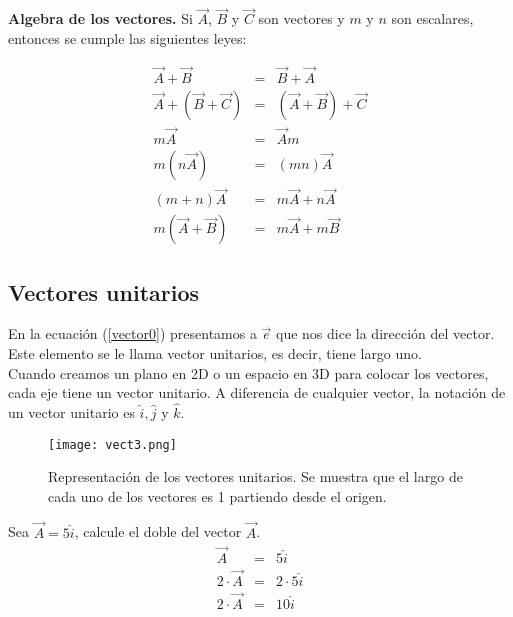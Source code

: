 \begin{mydef}
\textbf{Algebra de los vectores. }Si $\vec{A}$, $\vec{B}$ y $\vec{C}$ son vectores y $m$ y $n$ son escalares, entonces se cumple las siguientes leyes:
\end{mydef}
\begin{eqnarray}
\vec{A}+\vec{B}&=&\vec{B}+\vec{A}\\
\vec{A}+(\vec{B}+\vec{C})&=&(\vec{A}+\vec{B})+\vec{C}\\
m\vec{A}&=&\vec{A}m\\
m(n\vec{A})&=&(mn)\vec{A}\\
(m+n)\vec{A}&=&m\vec{A}+n\vec{A}\\
m(\vec{A}+\vec{B})&=&m\vec{A}+m\vec{B}
\end{eqnarray}



\subsection{Vectores unitarios}

En la ecuación (\ref{vector0}) presentamos a $\vec{e}$ que nos dice la dirección del vector. Este elemento se le llama vector unitarios, es decir, tiene largo uno.\\
Cuando creamos un plano en 2D o un espacio en 3D para colocar los vectores, cada eje tiene un vector unitario. A diferencia de cualquier vector, la notación de un vector unitario es $\hat{i}, \hat{j}$ y $\hat{k}$.

 \begin{center}
\begin{figure}[h!]
\centering
\texttt{[image: vect3.png]}
\caption[Representación de los vectores unitarios.]{Representación de los vectores unitarios. Se muestra que el largo de cada uno de los vectores es 1 partiendo desde el origen.} \label{vect3}
\end{figure}
\end{center}

\begin{myexample}
Sea $\vec{A}=5\hat{i}$, calcule el doble del vector $\vec{A}$.
\begin{eqnarray*}
\vec{A}&=&5\hat{i}\\
2\cdot\vec{A}&=&2\cdot 5\hat{i}\\
2\cdot\vec{A}&=&10\hat{i}\\
\end{eqnarray*}
\end{myexample}

